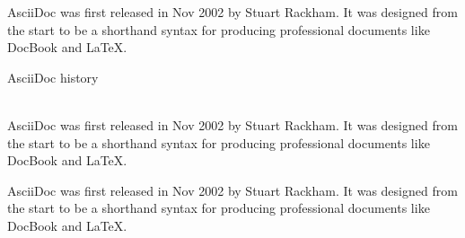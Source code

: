 \begin{sidebar}
AsciiDoc was first released in Nov 2002 by Stuart Rackham.
It was designed from the start to be a shorthand syntax
for producing professional documents like DocBook and LaTeX.
\end{sidebar}

\begin{sidebar}
\begin{bf}
AsciiDoc history
\end{bf}
\\AsciiDoc was first released in Nov 2002 by Stuart Rackham.
It was designed from the start to be a shorthand syntax
for producing professional documents like DocBook and LaTeX.
\end{sidebar}

\begin{sidebar}
\hypertarget{origin}{AsciiDoc was first released in Nov 2002 by Stuart Rackham.
It was designed from the start to be a shorthand syntax
for producing professional documents like DocBook and LaTeX.}
\end{sidebar}
